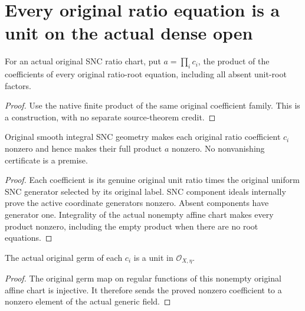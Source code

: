 \section{Every original ratio equation is a unit on the actual dense open}

\begin{definition}
\label{def:kn-canonical-original-ratio-product}
\leanok
For an actual original SNC ratio chart, put $a=\prod_i c_i$, the product
of the coefficients of every original ratio-root equation, including
all absent unit-root factors.
\end{definition}
\begin{proof}
Use the native finite product of the same original coefficient family.
This is a construction, with no separate source-theorem credit.
\end{proof}

\begin{lemma}
\label{lem:kn-canonical-original-ratio-coefficients-nonzero}
\leanok
Original smooth integral SNC geometry makes each original ratio
coefficient $c_i$ nonzero and hence makes their full product $a$ nonzero.
No nonvanishing certificate is a premise.
\end{lemma}
\begin{proof}
Each coefficient is its genuine original unit ratio times the original
uniform SNC generator selected by its original label. SNC component
ideals internally prove the active coordinate generators nonzero.
Absent components have generator one. Integrality of the actual
nonempty affine chart makes every product nonzero, including the empty
product when there are no root equations.
\end{proof}

\begin{lemma}
\label{lem:kn-canonical-original-ratio-generic-units}
\leanok
The actual original germ of each $c_i$ is a unit in
$\mathcal O_{X,\eta}$.
\end{lemma}
\begin{proof}
The original germ map on regular functions of this nonempty original
affine chart is injective. It therefore sends the proved nonzero
coefficient to a nonzero element of the actual generic field.
\end{proof}

